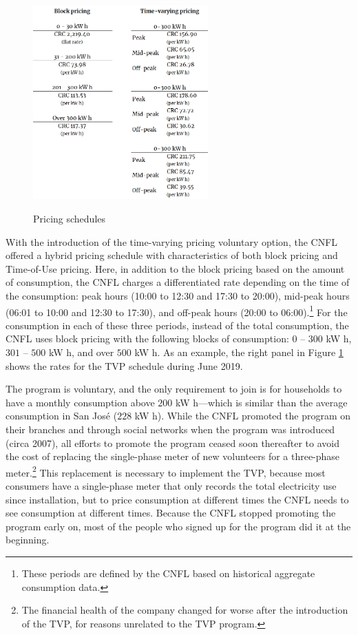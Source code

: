\documentclass[12pt]{article}
\begin{document}
\begin{figure}[ht]
  \caption{Pricing schedules}\label{fig:table1}
  \begin{center}
  {\includegraphics[width=0.6\textwidth]{./figures/table1.png}}
  \end{center}
\end{figure}

With the introduction of the time-varying pricing voluntary option, the CNFL offered a hybrid pricing schedule with characteristics of both block pricing and Time-of-Use pricing. Here, in addition to the block pricing based on the amount of consumption, the CNFL charges a differentiated rate depending on the time of the consumption: peak hours (10:00 to 12:30 and 17:30 to 20:00), mid-peak hours (06:01 to 10:00 and 12:30 to 17:30), and off-peak hours (20:00 to 06:00).\footnote{These periods are defined by the CNFL based on historical aggregate consumption data.} For the consumption in each of these three periods, instead of the total consumption, the CNFL uses block pricing with the following blocks of consumption: $0$ – $300$ kW h, $301$ – $500$ kW h, and over $500$ kW h. As an example, the right panel in Figure \ref{fig:table1} shows the rates for the TVP schedule during June 2019.

The program is voluntary, and the only requirement to join is for households to have a monthly consumption above $200$ kW h---which is similar than the average consumption in San José ($228$ kW h). While the CNFL promoted the program on their branches and through social networks when the program was introduced (circa 2007), all efforts to promote the program ceased soon thereafter to avoid the cost of replacing the single-phase meter of new volunteers for a three-phase meter.\footnote{The financial health of the company changed for worse after the introduction of the TVP, for reasons unrelated to the TVP program.} This replacement is necessary to implement the TVP, because most consumers have a single-phase meter that only records the total electricity use since installation, but to price consumption at different times the CNFL needs to see consumption at different times. Because the CNFL stopped promoting the program early on, most of the people who signed up for the program did it at the beginning.
\end{document}
